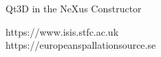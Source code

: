 \documentclass[usenames,dvipsnames]{beamer}
\begin{document}
\begin{frame}[t]
\begin{columns}[t]
\begin{column}{0.32\paperwidth}
\begin{custombox}{Qt3D in the NeXus Constructor}

\end{custombox}

\begin{tcolorbox}[enhanced,width=\linewidth,height=17cm,arc=5mm,
       interior style={fill overzoom image*={}{beamon.png}}]
\end{tcolorbox}
\vspace{-1.5cm}
\begin{center}
\color{white}\LARGE{https://www.isis.stfc.ac.uk\\https://europeanspallationsource.se}
\end{center}
\end{column}
\end{columns}
\end{frame}
\end{document}
